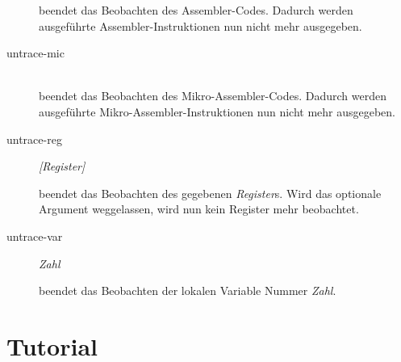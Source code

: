 \begin{description}
  beendet das Beobachten des Assembler-Codes. Dadurch werden ausgeführte Assembler-Instruktionen nun nicht mehr ausgegeben.

\item[untrace-mic] \hspace*{\fill}\\

  beendet das Beobachten des Mikro-Assembler-Codes. Dadurch werden ausgeführte Mikro-Assembler-Instruktionen nun nicht mehr ausgegeben.

\item[untrace-reg] \emph{[Register]}

  beendet das Beobachten des gegebenen \emph{Register}s. Wird das optionale Argument weggelassen, wird nun kein Register mehr beobachtet.

\item[untrace-var] \emph{Zahl}

  beendet das Beobachten der lokalen Variable Nummer \emph{Zahl}.
\end{description}

\section{Tutorial}
